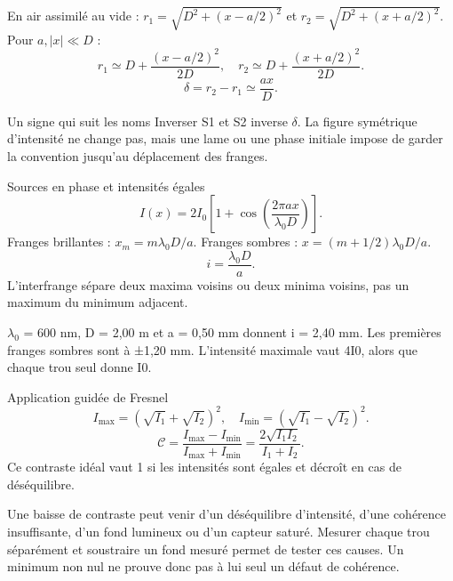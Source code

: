 En air assimilé au vide : $r_1=\sqrt{D^2+(x-a/2)^2}$ et $r_2=\sqrt{D^2+(x+a/2)^2}$. Pour $a,|x|\ll D$ :\[r_1\simeq D+\frac{(x-a/2)^2}{2D},\quad r_2\simeq D+\frac{(x+a/2)^2}{2D}.\]\[\delta=r_2-r_1\simeq\frac{ax}{D}.\]
\begin{piege}{Un signe qui suit les noms}
Inverser S1 et S2 inverse \ensuremath{\delta}. La figure symétrique d’intensité ne change pas, mais une lame ou une phase initiale impose de garder la convention jusqu’au déplacement des franges.
\end{piege}


\begin{loi}{Sources en phase et intensités égales}
\[I(x)=2I_0\left[1+\cos\left(\frac{2\pi ax}{\lambda_0D}\right)\right].\]Franges brillantes : $x_m=m\lambda_0D/a$. Franges sombres : $x=(m+1/2)\lambda_0D/a$.\[i=\frac{\lambda_0D}{a}.\]L’interfrange sépare deux maxima voisins ou deux minima voisins, pas un maximum du minimum adjacent.
\end{loi}
\ensuremath{\lambda_0} = 600 nm, D = 2,00 m et a = 0,50 mm donnent i = 2,40 mm. Les premières franges sombres sont à ±1,20 mm. L’intensité maximale vaut 4I0, alors que chaque trou seul donne I0.


\begin{loi}{Application guidée de Fresnel}
\[I_{\max}=(\sqrt{I_1}+\sqrt{I_2})^2,\quad I_{\min}=(\sqrt{I_1}-\sqrt{I_2})^2.\]\[\mathcal C=\frac{I_{\max}-I_{\min}}{I_{\max}+I_{\min}}=\frac{2\sqrt{I_1I_2}}{I_1+I_2}.\]Ce contraste idéal vaut 1 si les intensités sont égales et décroît en cas de déséquilibre.
\end{loi}
Une baisse de contraste peut venir d’un déséquilibre d’intensité, d’une cohérence insuffisante, d’un fond lumineux ou d’un capteur saturé. Mesurer chaque trou séparément et soustraire un fond mesuré permet de tester ces causes. Un minimum non nul ne prouve donc pas à lui seul un défaut de cohérence.


